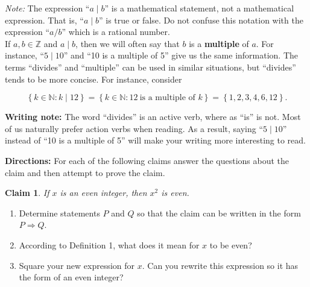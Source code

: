 \documentclass[12 pt]{article}
\newcommand{\Z}{\mathbb{Z}}
\newcommand{\N}{\mathbb{N}}
\newcommand{\set}[1]{\left\{#1\right\}}
\newcommand{\divides}{\! \mid \!}
\theoremstyle{definition}
\theoremstyle{plain}
\theoremstyle{mytheorem}
\newtheorem{claim}{Claim}
\theoremstyle{myexample}
\theoremstyle{mydefinition}
\begin{document}
\noindent \textit{Note:} The expression ``$a \divides b$'' is a mathematical statement, not a mathematical expression.  That is, ``$a \divides b$'' is true or false.  Do not confuse this notation with the expression ``$a/b$'' which is a rational number.\\

\noindent  If $a,b \in \Z$ and $a \divides b$, then we will often say that $b$ is a \textbf{multiple} of $a$.  For instance, ``$5 \divides 10$'' and ``10 is a multiple of 5'' give us the same information.  The terms ``divides'' and ``multiple'' can be used in similar situations, but ``divides'' tends to be more concise.  For instance, consider

\[\set{k \in \N : k \divides 12} = \set{k \in \N : 12 \ \text{is a multiple of }k} = \set{1,2,3,4,6,12}.\]

\noindent \textbf{Writing note:}  The word ``divides'' is an active verb, where as ``is'' is not.  Most of us naturally prefer action verbs when reading.  As a result, saying ``$5 \divides 10$'' instead of ``10 is a multiple of 5'' will make your writing more interesting to read.

\medskip

\noindent \textbf{Directions:}  For each of the following claims answer the questions about the claim and then attempt to prove the claim.

\begin{claim}  If $x$ is an even integer, then $x^2$ is even.
\end{claim}

	\begin{enumerate}[label=(\alph*)]
	\item  Determine statements $P$ and $Q$ so that the claim can be written in the form $P \Rightarrow Q$.
	\vspace{1in}
	
	\item  According to Definition 1, what does it mean for $x$ to be even?
	
	\vspace{.75in}
	
	\item  Square your new expression for $x$.  Can you rewrite this expression so it has the form of an even integer?
	\end{enumerate}
	
	\vspace{1in}

\fbox{\parbox{6in}{
\begin{proof} Let $x\in \Z$ be even.

\vspace{2.25in}

\end{proof}
}}
\newpage 
\end{document}
